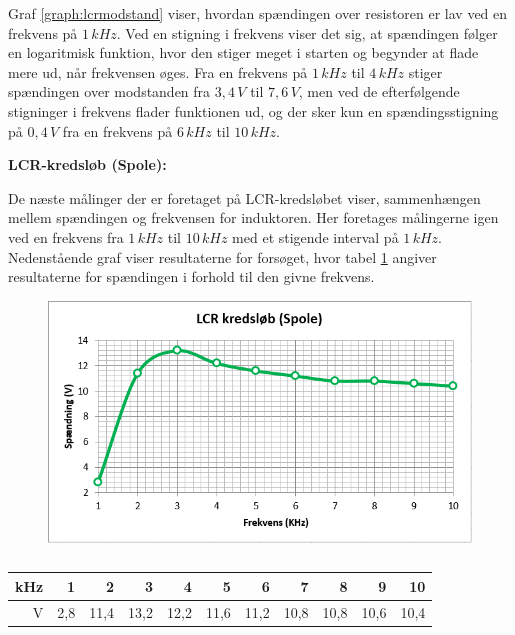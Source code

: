 Graf \ref{graph:lcrmodstand} viser, hvordan spændingen over resistoren er lav ved en frekvens på $1\, kHz$. Ved en stigning i frekvens viser det sig, at spændingen følger en logaritmisk funktion, hvor den stiger meget i starten og begynder at flade mere ud, når frekvensen øges. Fra en frekvens på $1\, kHz$ til $4\, kHz$ stiger spændingen over modstanden fra $3,4\, V$ til $7,6\, V$, men ved de efterfølgende stigninger i frekvens flader funktionen ud, og der sker kun en spændingsstigning på $0,4\, V$ fra en frekvens på $6\, kHz$ til $10\, kHz$.

\textbf{LCR-kredsløb (Spole):}

De næste målinger der er foretaget på LCR-kredsløbet viser, sammenhængen mellem spændingen og frekvensen for induktoren. Her foretages målingerne igen ved en frekvens fra $1\, kHz$ til $10\, kHz$ med et stigende interval på $1\, kHz$. Nedenstående graf viser resultaterne for forsøget, hvor tabel \ref{tabular:lcrspole} angiver resultaterne for spændingen i forhold til den givne frekvens.

\begin{figure}[H]
\includegraphics[scale=1]{Setup/Graf6}
\caption{}
\label{graph:lcrspole}
\end{figure}

\begin{table}[H]
\centering
\begin{tabular}{|r|r|r|r|r|r|r|r|r|r|r|} \hline
kHz & 1 & 2 & 3 & 4 & 5 & 6 & 7 & 8 & 9 & 10 \\ \hline
V & 2,8 & 11,4 & 13,2 & 12,2 & 11,6 & 11,2 & 10,8 & 10,8 & 10,6 & 10,4 \\ \hline
\end{tabular}
\caption{}
\label{tabular:lcrspole}
\end{table}

